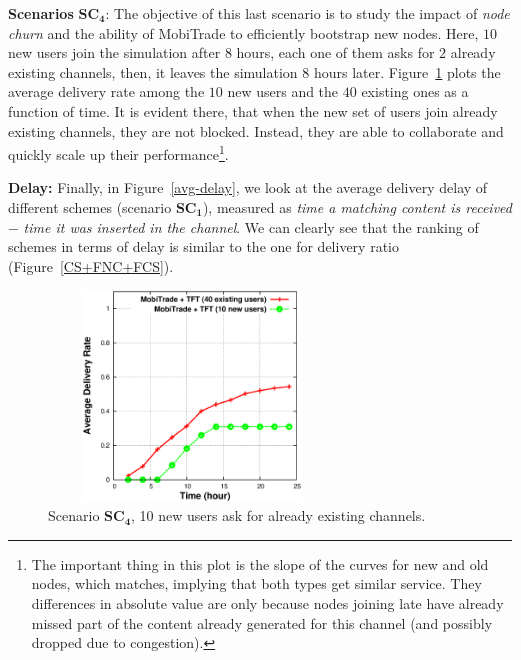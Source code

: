 \noindent \textbf{Scenarios} $\mathbf{SC_{4}}$: The objective of this last scenario is to study the impact of \emph{node churn} and the ability of MobiTrade to efficiently bootstrap new nodes. Here, $10$ new users join the simulation after $8$ hours, each one of them asks for $2$ already existing channels, then, it leaves the simulation $8$ hours later. Figure~\ref{10-new-users} plots the average delivery rate among the $10$ new users and the $40$ existing ones as a function of time.
It is evident there, that when the new set of users join already existing channels, they are not blocked. Instead, they are able to collaborate and quickly scale up their performance\footnote{The important thing in this plot is the slope of the curves for new and old nodes, which matches, implying that both types get 
similar service. They differences in absolute value are only because nodes joining late have already missed part of the content already generated for this channel (and possibly dropped due to congestion).}.

\noindent \textbf{Delay:} Finally, in Figure~\ref{avg-delay}, we look at the average delivery delay of different schemes (scenario $\mathbf{SC_{1}}$), measured as \emph{time a matching content is received} $-$ \emph{time it was inserted in the channel}. We can clearly see that the ranking of schemes in terms of delay is similar to the one for delivery ratio (Figure~\ref{CS+FNC+FCS}).

\begin{figure}[!h]
  \begin{center}
    \includegraphics[width=3in,height=2.2in]{Chapitre5/fig8.eps}
  \end{center}
  \caption{Scenario $\mathbf{SC_4}$, 10 new users ask for already existing channels.}
  \label{10-new-users}
\end{figure}

